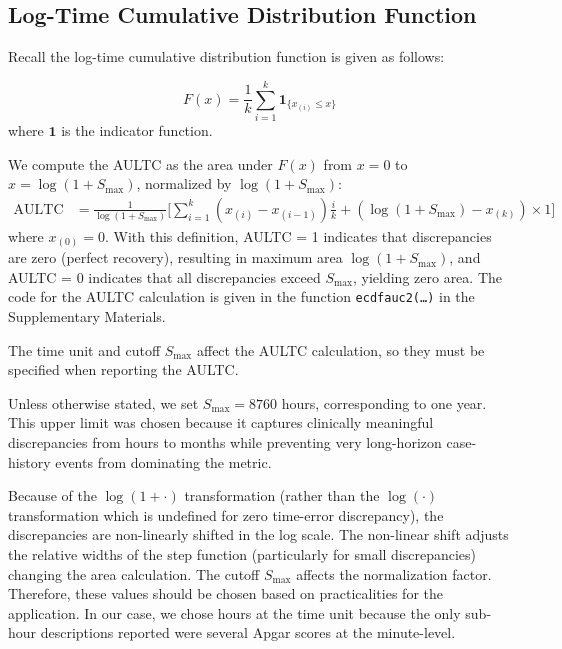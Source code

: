 \subsection{Log-Time Cumulative Distribution Function}
\label{ch06:apd:ltcdf}


Recall the log-time cumulative distribution function is given as follows:

\[
   F(x) = \frac{1}{k} \sum_{i=1}^k \mathbf{1}_{\{x_{(i)} \leq x\}}
\]
where $\mathbf{1}$ is the indicator function.



We compute the AULTC as the area under $F(x)$ from $x = 0$ to $x = \log(1 + S_{\text{max}})$, normalized by $\log(1 + S_{\text{max}})$:
\begin{align*}
\text{AULTC} &= \frac{1}{\log(1 + S_{\text{max}})} \Bigg[ \sum_{i=1}^k (x_{(i)} - x_{(i-1)}) \frac{i}{k} + (\log(1 + S_{\text{max}}) - x_{(k)}) \times 1 \Bigg]
\end{align*}
where $x_{(0)} = 0$.
With this definition, AULTC = 1 indicates that discrepancies are zero (perfect recovery), resulting in maximum area $\log(1 + S_{\text{max}})$, and AULTC = 0 indicates that all discrepancies exceed $S_{\text{max}}$, yielding zero area. 
The code for the AULTC calculation is given in the function \texttt{ecdf\textunderscore auc2(\dots)} in the Supplementary Materials.


\begin{ChSixRemark}
The time unit and cutoff $S_\text{max}$ affect the AULTC calculation, so they must be specified when reporting the AULTC.
\end{ChSixRemark}
Unless otherwise stated, we set $S_{\max}=8760$ hours, corresponding to one year.
This upper limit was chosen because it captures clinically meaningful discrepancies from hours to months while preventing very long-horizon case-history events from dominating the metric.

Because of the $\log(1 + \cdot)$ transformation (rather than the $\log(\cdot)$ transformation which is undefined for zero time-error discrepancy), the discrepancies are non-linearly shifted in the log scale.
The non-linear shift adjusts the relative widths of the step function (particularly for small discrepancies) changing the area calculation.
The cutoff $S_\text{max}$ affects the normalization factor.
Therefore, these values should be chosen based on practicalities for the application.
In our case, we chose hours at the time unit because the only sub-hour descriptions reported were several Apgar scores at the minute-level.

